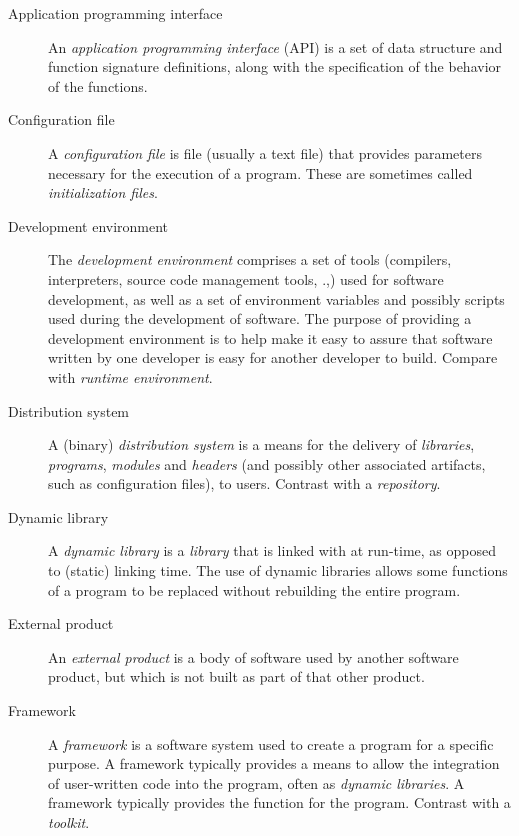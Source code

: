 \documentclass{memarticle}
\begin{document}
\begin{description}

\item[Application programming interface] An \emph{application
    programming interface} (API) is a set of data structure and function
  signature definitions, along with the specification of the behavior of
  the functions.

\item[Configuration file] A \emph{configuration file} is file (usually a
  text file) that provides parameters necessary for the execution of a
  program. These are sometimes called \emph{initialization files}.

\item[Development environment] The \emph{development environment}
  comprises a set of tools (compilers, interpreters, source code
  management tools, \etc.,) used for software development, as well as a
  set of environment variables and possibly scripts used during the
  development of software. The purpose of providing a development
  environment is to help make it easy to assure that software written by
  one developer is easy for another developer to build. Compare with
  \emph{runtime environment}.

\item[Distribution system] A (binary) \emph{distribution system} is a
  means for the delivery of \emph{libraries}, \emph{programs},
  \emph{modules} and \emph{headers} (and possibly other associated
  artifacts, such as configuration files), to users. Contrast with a
  \emph{repository}.

\item[Dynamic library] A \emph{dynamic library} is a \emph{library} that
  is linked with at run-time, as opposed to (static) linking time. The
  use of dynamic libraries allows some functions of a program to be
  replaced without rebuilding the entire program.

\item[External product] An \emph{external product} is a body of software
  used by another software product, but which is not built as part of
  that other product.

\item[Framework] A \emph{framework} is a software system used to create
  a program for a specific purpose. A framework typically provides a
  means to allow the integration of user-written code into the program,
  often as \emph{dynamic libraries}. A framework typically provides the
   function for the program. Contrast with a \emph{toolkit}.


\end{description}
\end{document}

